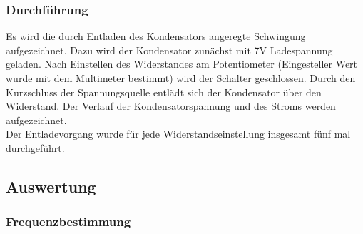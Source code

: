 \documentclass[12pt,a4paper]{article}
\begin{document}
\subsubsection{Durchführung}
Es wird die durch Entladen des Kondensators angeregte Schwingung aufgezeichnet. Dazu wird der Kondensator zunächst mit 7V Ladespannung geladen. Nach Einstellen des Widerstandes am Potentiometer (Eingesteller Wert wurde mit dem Multimeter bestimmt) wird der Schalter geschlossen. Durch den Kurzschluss der Spannungsquelle entlädt sich der Kondensator über den Widerstand. Der Verlauf der Kondensatorspannung und des Stroms werden aufgezeichnet.\\
Der Entladevorgang wurde für jede Widerstandseinstellung insgesamt fünf mal durchgeführt.


\subsection{Auswertung}

\subsubsection{Frequenzbestimmung}
\end{document}
